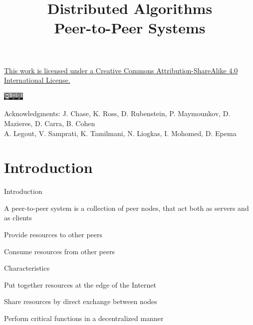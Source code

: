 
\title[DS - P2P]{\textbf{Distributed Algorithms}\\Peer-to-Peer Systems}



\newcommand{\ID}{\mathit{ID}}

{
\begin{frame}[noframenumbering]
	\titlepage
	\begin{center}
		\href{http://creativecommons.org/licenses/by-sa/4.0/}{This work is licensed under a Creative Commons Attribution-ShareAlike 4.0 International License.}
		
		\smallskip
		\includegraphics[width=1cm]{figs/cc.png}

	\bigskip
		{\tiny
			Acknowledgments: J. Chase, K. Ross, D. Rubenstein, P. Maymounkov, D. Mazieres, D. Carra,  B. Cohen \\
			\hspace{1.6cm} A. Legout, V. Samprati, K. Tamilmani, N. Liogkas, I. Mohomed, D. Epema
		}
	\end{center}


\end{frame}
}





\section{Introduction}

\begin{frame}{Introduction}

\begin{definition}
A peer-to-peer system is a collection of \alert{peer} nodes, that act
both as servers and as clients
\BI
\item Provide resources to other peers
\item Consume resources from other peers
\EI
\end{definition}

\smallskip
\begin{block}{Characteristics}
\BI
\item Put together resources at the edge of the Internet
\item Share resources by direct exchange between nodes
\item Perform critical functions in a decentralized manner
\EI
\end{block}
\end{frame}

